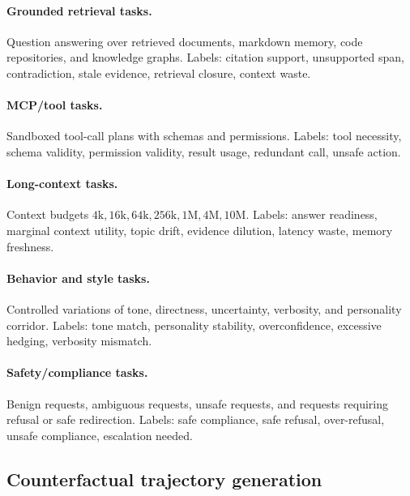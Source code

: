\documentclass[11pt]{article}
\theoremstyle{definition}
\theoremstyle{remark}
\numberwithin{equation}{section}
\begin{document}
\paragraph{Grounded retrieval tasks.}  Question answering over retrieved documents, markdown memory, code repositories, and knowledge graphs.  Labels: citation support, unsupported span, contradiction, stale evidence, retrieval closure, context waste.

\paragraph{MCP/tool tasks.}  Sandboxed tool-call plans with schemas and permissions.  Labels: tool necessity, schema validity, permission validity, result usage, redundant call, unsafe action.

\paragraph{Long-context tasks.}  Context budgets \(4\mathrm{k},16\mathrm{k},64\mathrm{k},256\mathrm{k},1\mathrm{M},4\mathrm{M},10\mathrm{M}\).  Labels: answer readiness, marginal context utility, topic drift, evidence dilution, latency waste, memory freshness.

\paragraph{Behavior and style tasks.}  Controlled variations of tone, directness, uncertainty, verbosity, and personality corridor.  Labels: tone match, personality stability, overconfidence, excessive hedging, verbosity mismatch.

\paragraph{Safety/compliance tasks.}  Benign requests, ambiguous requests, unsafe requests, and requests requiring refusal or safe redirection.  Labels: safe compliance, safe refusal, over-refusal, unsafe compliance, escalation needed.

\subsection{Counterfactual trajectory generation}
\end{document}

